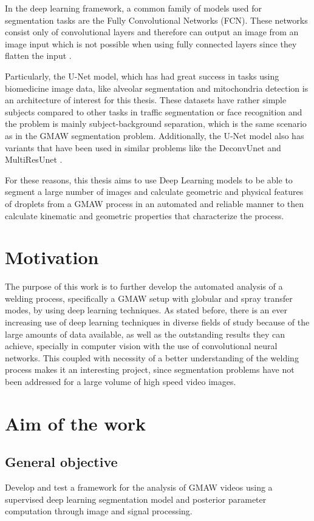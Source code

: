 \begin{intro}
In the deep learning framework, a common family of models used for segmentation tasks are the Fully Convolutional Networks (FCN). These networks consist only of convolutional layers and therefore can output an image from an image input which is not possible when using fully connected layers since they flatten the input \cite{segmentation-survey}. 

Particularly, the U-Net model, which has had great success in tasks using biomedicine image data, like alveolar segmentation and mitochondria detection \cite{Duong, Casser} is an architecture of interest for this thesis. These datasets have rather simple subjects compared to other tasks in traffic segmentation or face recognition and the problem is mainly subject-background separation, which is the same scenario as in the GMAW segmentation problem. Additionally, the U-Net model also has variants that have been used in similar problems like the DeconvUnet and MultiResUnet \cite{Noh, Ibtehaz}.

For these reasons, this thesis aims to use Deep Learning models to be able to segment a large number of images and calculate geometric and physical features of droplets from a GMAW process in an automated and reliable manner to then calculate kinematic and geometric properties that characterize the process.

\section{Motivation}

The purpose of this work is to further develop the automated analysis of a welding process, specifically a GMAW setup with globular and spray transfer modes, by using deep learning techniques. As stated before, there is an ever increasing use of deep learning techniques in diverse fields of study because of the large amounts of data available, as well as the outstanding results they can achieve, specially in computer vision with the use of convolutional neural networks. This coupled with necessity of a better understanding of the welding process makes it an interesting project, since segmentation problems have not been addressed for a large volume of high speed video images.

\section{Aim of the work}
\subsection{General objective}
Develop and test a framework for the analysis of GMAW videos using a supervised deep learning segmentation model and posterior parameter computation through image and signal processing.


\end{intro}
